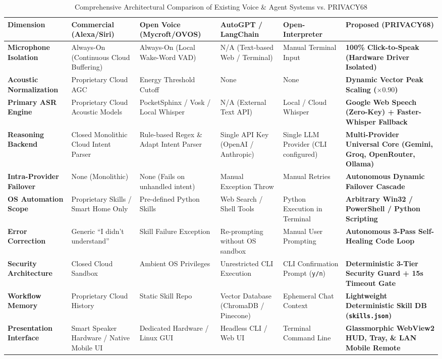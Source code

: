 \begin{table}[htbp]
\centering
\scriptsize
\caption{Comprehensive Architectural Comparison of Existing Voice \& Agent Systems vs. PRIVACY68}
\label{tab:literature_comparison}
\begin{tabularx}{\textwidth}{|p{2.2cm}|X|X|X|X|p{2.6cm}|}
\hline
\textbf{Dimension} & \textbf{Commercial (Alexa/Siri)} & \textbf{Open Voice (Mycroft/OVOS)} & \textbf{AutoGPT / LangChain} & \textbf{Open-Interpreter} & \textbf{Proposed (PRIVACY68)} \\ \hline
\textbf{Microphone Isolation} & Always-On (Continuous Cloud Buffering) & Always-On (Local Wake-Word VAD) & N/A (Text-based Web / Terminal) & Manual Terminal Input & \textbf{100\% Click-to-Speak (Hardware Driver Isolated)} \\ \hline
\textbf{Acoustic Normalization} & Proprietary Cloud AGC & Energy Threshold Cutoff & None & None & \textbf{Dynamic Vector Peak Scaling ($\times 0.90$)} \\ \hline
\textbf{Primary ASR Engine} & Proprietary Cloud Acoustic Models & PocketSphinx / Vosk / Local Whisper & N/A (External Text API) & Local / Cloud Whisper & \textbf{Google Web Speech (Zero-Key) + Faster-Whisper Fallback} \\ \hline
\textbf{Reasoning Backend} & Closed Monolithic Cloud Intent Parser & Rule-based Regex \& Adapt Intent Parser & Single API Key (OpenAI / Anthropic) & Single LLM Provider (CLI configured) & \textbf{Multi-Provider Universal Core (Gemini, Groq, OpenRouter, Ollama)} \\ \hline
\textbf{Intra-Provider Failover} & None (Monolithic) & None (Fails on unhandled intent) & Manual Exception Throw & Manual Retries & \textbf{Autonomous Dynamic Failover Cascade} \\ \hline
\textbf{OS Automation Scope} & Proprietary Skills / Smart Home Only & Pre-defined Python Skills & Web Search / Shell Tools & Python Execution in Terminal & \textbf{Arbitrary Win32 / PowerShell / Python Scripting} \\ \hline
\textbf{Error Correction} & Generic ``I didn't understand'' & Skill Failure Exception & Re-prompting without OS sandbox & Manual User Prompting & \textbf{Autonomous 3-Pass Self-Healing Code Loop} \\ \hline
\textbf{Security Architecture} & Closed Cloud Sandbox & Ambient OS Privileges & Unrestricted CLI Execution & CLI Confirmation Prompt (\texttt{y/n}) & \textbf{Deterministic 3-Tier Security Guard + 15s Timeout Gate} \\ \hline
\textbf{Workflow Memory} & Proprietary Cloud History & Static Skill Repo & Vector Database (ChromaDB / Pinecone) & Ephemeral Chat Context & \textbf{Lightweight Deterministic Skill DB (\texttt{skills.json})} \\ \hline
\textbf{Presentation Interface} & Smart Speaker Hardware / Native Mobile UI & Dedicated Hardware / Linux GUI & Headless CLI / Web UI & Terminal Command Line & \textbf{Glassmorphic WebView2 HUD, Tray, \& LAN Mobile Remote} \\ \hline
\end{tabularx}
\end{table}

